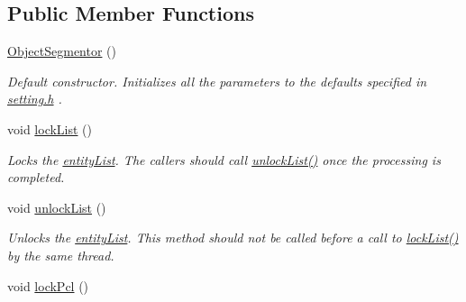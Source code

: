 \subsection*{Public Member Functions}
\begin{DoxyCompactItemize}
\item 
\hyperlink{classpersonal_robotics_1_1_object_segmentor_a09e8d870efcb51ed0cb0aa95b6c28552}{Object\+Segmentor} ()
\begin{DoxyCompactList}\small\item\em Default constructor. Initializes all the parameters to the defaults specified in \hyperlink{}{setting.\+h} . \end{DoxyCompactList}\item 
\hypertarget{classpersonal_robotics_1_1_object_segmentor_a970e0509a3d2d02ca856e707e3c9d767}{}void \hyperlink{classpersonal_robotics_1_1_object_segmentor_a970e0509a3d2d02ca856e707e3c9d767}{lock\+List} ()\label{classpersonal_robotics_1_1_object_segmentor_a970e0509a3d2d02ca856e707e3c9d767}

\begin{DoxyCompactList}\small\item\em Locks the \hyperlink{classpersonal_robotics_1_1_object_segmentor_aab2136d73a02806e2b09611ed67e65d9}{entity\+List}. The callers should call \hyperlink{classpersonal_robotics_1_1_object_segmentor_a935000c5a4446dc90c768e4fa0c104b9}{unlock\+List()} once the processing is completed. \end{DoxyCompactList}\item 
\hypertarget{classpersonal_robotics_1_1_object_segmentor_a935000c5a4446dc90c768e4fa0c104b9}{}void \hyperlink{classpersonal_robotics_1_1_object_segmentor_a935000c5a4446dc90c768e4fa0c104b9}{unlock\+List} ()\label{classpersonal_robotics_1_1_object_segmentor_a935000c5a4446dc90c768e4fa0c104b9}

\begin{DoxyCompactList}\small\item\em Unlocks the \hyperlink{classpersonal_robotics_1_1_object_segmentor_aab2136d73a02806e2b09611ed67e65d9}{entity\+List}. This method should not be called before a call to \hyperlink{classpersonal_robotics_1_1_object_segmentor_a970e0509a3d2d02ca856e707e3c9d767}{lock\+List()} by the same thread. \end{DoxyCompactList}\item 
\hypertarget{classpersonal_robotics_1_1_object_segmentor_ad5b256a48208fbbb84f8e06b14f5e1c4}{}void \hyperlink{classpersonal_robotics_1_1_object_segmentor_ad5b256a48208fbbb84f8e06b14f5e1c4}{lock\+Pcl} ()\label{classpersonal_robotics_1_1_object_segmentor_ad5b256a48208fbbb84f8e06b14f5e1c4}


\end{DoxyCompactItemize}
